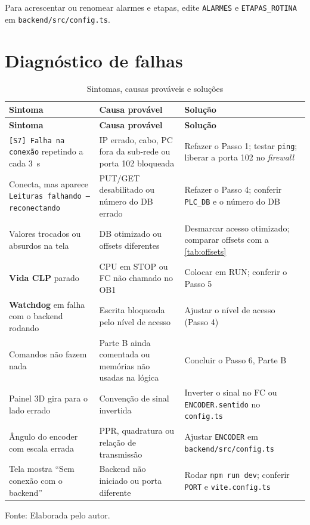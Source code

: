 \documentclass[12pt, oneside, a4paper, chapter=TITLE, section=TITLE, english, brazil]{abntex2}
\begin{document}
Para acrescentar ou renomear alarmes e etapas, edite \texttt{ALARMES} e \texttt{ETAPAS\_ROTINA} em \texttt{backend/src/config.ts}.

\chapter{Diagnóstico de falhas}

\begin{longtable}{>{\raggedright\arraybackslash}p{}>{\raggedright\arraybackslash}p{}>{\raggedright\arraybackslash}p{}}
\caption{Sintomas, causas prováveis e soluções} \label{tab:falhas} \\
\toprule
\textbf{Sintoma} & \textbf{Causa provável} & \textbf{Solução} \\
\midrule
\endfirsthead
\toprule
\textbf{Sintoma} & \textbf{Causa provável} & \textbf{Solução} \\
\midrule
\endhead
\texttt{[S7] Falha na conexão} repetindo a cada 3~s & IP errado, cabo, PC fora da sub-rede ou porta 102 bloqueada & Refazer o Passo 1; testar \texttt{ping}; liberar a porta 102 no \emph{firewall} \\
Conecta, mas aparece \texttt{Leituras falhando --- reconectando} & PUT/GET desabilitado ou número do DB errado & Refazer o Passo 4; conferir \texttt{PLC\_DB} e o número do DB \\
Valores trocados ou absurdos na tela & DB otimizado ou offsets diferentes & Desmarcar acesso otimizado; comparar offsets com a \autoref{tab:offsets} \\
\textbf{Vida CLP} parado & CPU em STOP ou FC não chamado no OB1 & Colocar em RUN; conferir o Passo 5 \\
\textbf{Watchdog} em falha com o backend rodando & Escrita bloqueada pelo nível de acesso & Ajustar o nível de acesso (Passo 4) \\
Comandos não fazem nada & Parte B ainda comentada ou memórias não usadas na lógica & Concluir o Passo 6, Parte B \\
Painel 3D gira para o lado errado & Convenção de sinal invertida & Inverter o sinal no FC ou \texttt{ENCODER.sentido} no \texttt{config.ts} \\
Ângulo do encoder com escala errada & PPR, quadratura ou relação de transmissão & Ajustar \texttt{ENCODER} em \texttt{backend/src/config.ts} \\
Tela mostra ``Sem conexão com o backend'' & Backend não iniciado ou porta diferente & Rodar \texttt{npm run dev}; conferir \texttt{PORT} e \texttt{vite.config.ts} \\
\bottomrule
\end{longtable}
\vspace{-0.6cm}
\begin{center}\small Fonte: Elaborada pelo autor.\end{center}
\end{document}
